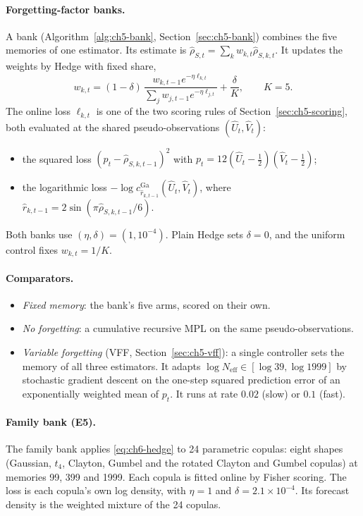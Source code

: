 \paragraph{Forgetting-factor banks.}
A bank (Algorithm~\ref{alg:ch5-bank}, Section~\ref{sec:ch5-bank}) combines the five memories of one estimator.
Its estimate is $\widehat\rho_{S,t} = \sum_k w_{k,t}\widehat\rho_{S,k,t}$.
It updates the weights by Hedge with fixed share,
\begin{equation}\label{eq:ch6-hedge}
  w_{k,t} = (1-\delta)\,\frac{w_{k,t-1}e^{-\eta\ell_{k,t}}}{\sum_j w_{j,t-1}e^{-\eta\ell_{j,t}}} + \frac{\delta}{K}, \qquad K = 5.
\end{equation}
The online loss $\ell_{k,t}$ is one of the two scoring rules of Section~\ref{sec:ch5-scoring}, both evaluated at the shared pseudo-observations $(\widehat U_t, \widehat V_t)$:
\begin{itemize}
  \item the squared loss $(p_t - \widehat\rho_{S,k,t-1})^2$ with $p_t = 12(\widehat U_t - \tfrac12)(\widehat V_t - \tfrac12)$;
  \item the logarithmic loss $-\log c^{\mathrm{Ga}}_{\widehat r_{k,t-1}}(\widehat U_t, \widehat V_t)$, where $\widehat r_{k,t-1} = 2\sin(\pi\widehat\rho_{S,k,t-1}/6)$.
\end{itemize}
Both banks use $(\eta, \delta) = (1, 10^{-4})$.
Plain Hedge sets $\delta = 0$, and the uniform control fixes $w_{k,t} = 1/K$.

\paragraph{Comparators.}
\begin{itemize}
  \item \emph{Fixed memory}: the bank's five arms, scored on their own.
  \item \emph{No forgetting}: a cumulative recursive MPL on the same pseudo-observations.
  \item \emph{Variable forgetting} (VFF, Section~\ref{sec:ch5-vff}): a single controller sets the memory of all three estimators.
    It adapts $\log N_{\mathrm{eff}} \in [\log 39, \log 1999]$ by stochastic gradient descent on the one-step squared prediction error of an exponentially weighted mean of $p_t$.
    It runs at rate $0.02$ (slow) or $0.1$ (fast).
\end{itemize}

\paragraph{Family bank (E5).}
The family bank applies \eqref{eq:ch6-hedge} to 24 parametric copulas: eight shapes (Gaussian, $t_4$, Clayton, Gumbel and the rotated Clayton and Gumbel copulas) at memories 99, 399 and 1999.
Each copula is fitted online by Fisher scoring.
The loss is each copula's own log density, with $\eta = 1$ and $\delta = 2.1\times10^{-4}$.
Its forecast density is the weighted mixture of the 24 copulas.

